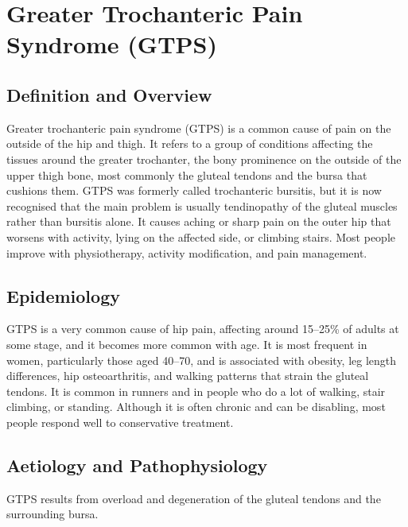 \chapter{Greater Trochanteric Pain Syndrome (GTPS)}

\section*{Definition and Overview}
Greater trochanteric pain syndrome (GTPS) is a common cause of pain on the outside of the hip and thigh. It refers to a group of conditions affecting the tissues around the greater trochanter, the bony prominence on the outside of the upper thigh bone, most commonly the gluteal tendons and the bursa that cushions them. GTPS was formerly called trochanteric bursitis, but it is now recognised that the main problem is usually tendinopathy of the gluteal muscles rather than bursitis alone. It causes aching or sharp pain on the outer hip that worsens with activity, lying on the affected side, or climbing stairs. Most people improve with physiotherapy, activity modification, and pain management.

\section*{Epidemiology}
GTPS is a very common cause of hip pain, affecting around 15--25\% of adults at some stage, and it becomes more common with age. It is most frequent in women, particularly those aged 40--70, and is associated with obesity, leg length differences, hip osteoarthritis, and walking patterns that strain the gluteal tendons. It is common in runners and in people who do a lot of walking, stair climbing, or standing. Although it is often chronic and can be disabling, most people respond well to conservative treatment.

\section*{Aetiology and Pathophysiology}
GTPS results from overload and degeneration of the gluteal tendons and the surrounding bursa.

